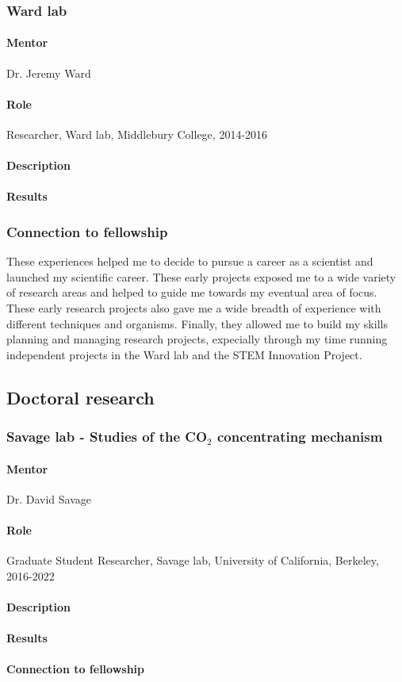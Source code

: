 \documentclass[11pt]{article}
\begin{document}
\subsubsection{Ward lab}
%
\paragraph{Mentor}
Dr. Jeremy Ward
%
\paragraph{Role}
Researcher, Ward lab, Middlebury College, 2014-2016
%
\paragraph{Description}
%
\paragraph{Results}
%
\subsubsection{Connection to fellowship}
These experiences helped me to decide to pursue a career as a scientist and launched my scientific career. 
These early projects exposed me to a wide variety of research areas and helped to guide me towards my eventual area of focus.
These early research projects also gave me a wide breadth of experience with different techniques and organisms.
Finally, they allowed me to build my skills planning and managing research projects, expecially through my time running independent projects in the Ward lab and the STEM Innovation Project.
%
\subsection{Doctoral research}
\subsubsection{Savage lab - Studies of the CO$_2$ concentrating mechanism}
\begin{refsection}
%
\paragraph{Mentor}
Dr. David Savage
%
\paragraph{Role}
Graduate Student Researcher, Savage lab, University of California, Berkeley, 2016-2022
%
\paragraph{Description}
%
\paragraph{Results}
%
\paragraph{Connection to fellowship}
%
\nocite{Desmarais2019-dc,Flamholz2022-yo}
\printbibliography[heading=none]
\end{refsection}
%
\end{document}
